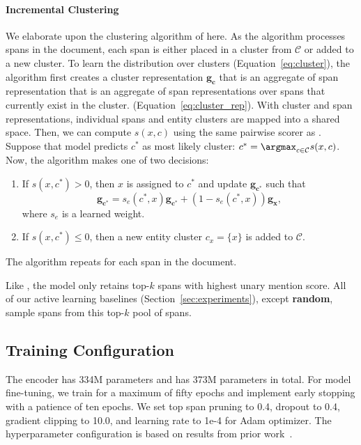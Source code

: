 \paragraph{Incremental Clustering}
We elaborate upon the clustering algorithm of \icoref{} here.
As the algorithm processes spans in the
document, each span is either placed in a cluster from $\mathcal{C}$ or
added to a new cluster.
To learn the distribution over clusters (Equation~\ref{eq:cluster}), the algorithm first creates a cluster
representation $\bm{g_c}$ that is an aggregate of span
representation that is an aggregate of span
representations over spans that currently exist in the cluster.
(Equation~\ref{eq:cluster_rep}).
With cluster and span representations, individual spans and entity clusters are
mapped into a shared space. Then, we can compute $s(x,c)$ using the same
pairwise scorer as \citet{lee-2018}.
Suppose that model predicts $c^*$ as most likely cluster: $c^* = \argmax_{c \in \mathcal{C}}
s(x,c)$. Now, the algorithm makes one of two decisions:
\begin{enumerate}
\item If $s(x, c^*) > 0$, then $x$ is assigned to $c^*$ and
    update $\bm{g_{c^*}}$ such that
    \begin{equation}
        \bm{g_{c^*}} = s_e(c^*,x) \bm{g_{c^*}} + (1-s_e(c^*,x)) \bm{g_x},
        \label{eq:cluster_rep}
    \end{equation}
    where $s_e$ is a learned weight.
\item If $s(x,c^*) \le 0$, then a new entity cluster $c_x = \{x\}$ is added to
$\mathcal{C}$.
\end{enumerate}
The algorithm repeats for each span in the document.

Like \ctof{}, the \icoref{} model only retains top-$k$ spans with highest unary
mention score.  All of our active learning baselines
(Section~\ref{sec:experiments}), except \textbf{random}, sample spans
from this top-$k$ pool of spans.


\subsection{Training Configuration}
\label{ssec:params}
The \spanbertlarge{} encoder has 334M parameters and \icoref{} has 373M parameters in total. For model fine-tuning, we train for a maximum of fifty epochs and implement early stopping
with a patience of ten epochs. We set
top span pruning to 0.4, dropout to 0.4, gradient clipping to 10.0, and learning
rate to 1e-4 for Adam optimizer.
The hyperparameter configuration is based on
results from prior work~\citep{lee-2017-coref,xia-2020}.

